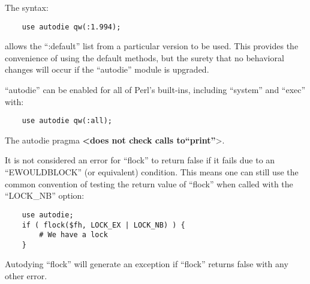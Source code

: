 \documentclass[]{article}
\let\realtextbf=\textbf
\renewcommand{\textbf}[1]{\textcolor{boldcolor}{\realtextbf{#1}}}
\begin{document}
The syntax:

\begin{verbatim}
    use autodie qw(:1.994);
\end{verbatim}

allows the ``:default'' list from a particular version to be used. This
provides the convenience of using the default methods, but the surety
that no behavioral changes will occur if the ``autodie'' module is
upgraded.

``autodie'' can be enabled for all of Perl's built-ins, including
``system'' and ``exec'' with:

\begin{verbatim}
    use autodie qw(:all);
\end{verbatim}



The autodie pragma \textbf{\textless{}does not check calls
to}\textbf{``print''}\textbf{}\textgreater{}.


It is not considered an error for ``flock'' to return false if it fails
due to an ``EWOULDBLOCK'' (or equivalent) condition. This means one can
still use the common convention of testing the return value of ``flock''
when called with the ``LOCK\_NB'' option:

\begin{verbatim}
    use autodie;
    if ( flock($fh, LOCK_EX | LOCK_NB) ) {
        # We have a lock
    }
\end{verbatim}

Autodying ``flock'' will generate an exception if ``flock'' returns
false with any other error.

\end{document}
